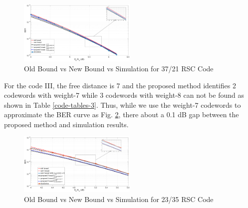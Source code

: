 \begin{figure}[htbp]
	\centering
	\includegraphics[width=0.5\textwidth]{./Images/RSC_37_21_lower_weights3.eps}
	\caption{Old Bound vs New Bound vs Simulation for 37/21 RSC Code}
	\label{simFig2}
\end{figure}

For the code III, the free distance is 7 and the proposed method identifies 2 codewords with weight-7 while 3 codewords with weight-8 can not be found as shown in Table \ref{code-tables-3}. Thus, while we use the weight-7 codewords to approximate the BER curve as Fig. \ref{simFig3}, there about a 0.1 dB gap between the proposed method and simulation results.

\begin{figure}[htbp]
	\centering
	\includegraphics[width=0.5\textwidth]{./Images/RSC_23_35_lower_weights3.eps}
	\caption{Old Bound vs New Bound vs Simulation for 23/35 RSC Code}
	\label{simFig3}
\end{figure}





